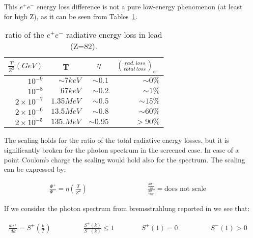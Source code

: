 This $e^+ e^-$ energy loss difference is not a pure low-energy
phenomenon (at least for high Z), as it can be seen from
Tables~\ref{ebrem.c}.

\begin{table}[hbt]
\begin{centering}
\begin{tabular}{rr|r|r} \hline
\multicolumn{1}{c}{$\frac{T}{Z^2} (GeV)$}
& \multicolumn{1}{c|}{T}
& \multicolumn{1}{c|}{$\eta$}
& \multicolumn{1}{c}{$\left ( \frac{rad. \ loss}{total \ loss}
\right )_{e^-}$} \\[3mm] \hline
$10^{-9}$ & $\sim 7 keV$ & $\sim 0.1$ & $\sim 0\%$ \\
$10^{-8}$ & $67 keV $ & $\sim 0.2$ & $\sim 1\%$ \\
$2 \times 10^{-7}$ & $1.35 MeV$ & $\sim 0.5$ & $\sim 15\%$ \\
$2 \times 10^{-6}$ & $13.5 MeV$ & $\sim 0.8$ & $\sim 60\%$ \\
$2 \times 10^{-5}$ & $135. MeV$ & $\sim 0.95$ & $> 90\%$ \\ \hline
\end{tabular}
\caption{ratio of the $e^+ e^-$ radiative energy loss in lead
(Z=82).}
\label{ebrem.c}
\end{centering}
\end{table}

The scaling holds for the ratio of the total radiative energy
losses, but it is significantly broken for the photon spectrum
in the screened case.
In case of a point Coulomb charge the
scaling would hold also for the spectrum.
The scaling can be expressed by:

\begin{eqnarray*}
\frac{\Phi^+}{\Phi^-} = \eta \left ( \frac{T}{Z^2} \right )
& \hspace{3cm} &
\frac{\frac{d\sigma^+}{dk}}{\frac{d\sigma^-}{dk}} =
\mbox{does not scale}
\end{eqnarray*}

If we consider the photon spectrum from bremsstrahlung reported
in \cite{ebrem.kim} we see that:

\begin{eqnarray*}
\frac{d\sigma^{\pm}}{dk} = S^{\pm} \left( \frac{k}{T} \right )
\hspace{2cm}
\frac{S^{+}(k)}{S^{-}(k)} \leq 1 & \hspace{1cm} & S^{+}(1) = 0
\hspace{2cm} S^{-}(1)  >  0
\end{eqnarray*}

